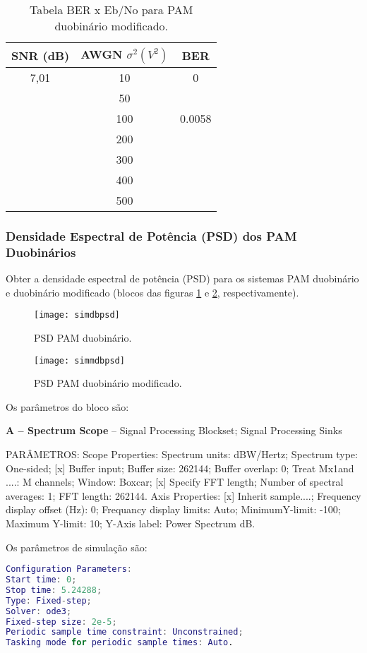 \begin{table}[H]
  \begin{center}
    \caption{Tabela BER x Eb/No para PAM duobinário modificado.}
    \begin{tabular}{|c|c|c|}
      \hline
      SNR (dB) & AWGN $\sigma^2 (V^2)$ & BER \\
      \hline
      7,01 & 10 & 0 \\
      \hline
      & 50 &  \\
      \hline
      & 100 & 0.0058 \\
      \hline
      & 200 & \\
      \hline
      & 300 & \\
      \hline
      & 400 & \\
      \hline 
      & 500 & \\
      \hline
    \end{tabular}
    \label{tab:simmdb}
  \end{center}
\end{table}

\subsubsection{Densidade Espectral de Potência (PSD) dos PAM Duobinários}

Obter a densidade espectral de potência (PSD) para os sistemas PAM duobinário e duobinário modificado (blocos das figuras \ref{fig:simdbpsd} e \ref{fig:simmdbpsd}, respectivamente).

\begin{figure}[H]
  \centering
  \caption{PSD PAM duobinário.}
  \texttt{[image: simdbpsd]}
  \label{fig:simdbpsd}
\end{figure}

\begin{figure}[H]
  \centering
  \caption{PSD PAM duobinário modificado.}
  \texttt{[image: simmdbpsd]}
  \label{fig:simmdbpsd}
\end{figure}

Os parâmetros do bloco são:

\textbf{A – Spectrum Scope} – Signal Processing Blockset; Signal Processing Sinks

PARÂMETROS: Scope Properties: Spectrum units: dBW/Hertz; Spectrum type: One-sided; [x] Buffer input; Buffer size: 262144; Buffer overlap: 0; Treat Mx1and ....: M channels; Window: Boxcar; [x] Specify FFT length; Number of spectral averages: 1; FFT length: 262144. Axis Properties: [x] Inherit sample....; Frequency display offset (Hz): 0; Frequancy display limits: Auto; MinimumY-limit: -100; Maximum Y-limit: 10; Y-Axis label: Power Spectrum dB.

Os parâmetros de simulação são:

\begin{lstlisting}[language=matlab]
Configuration Parameters: 
Start time: 0; 
Stop time: 5.24288; 
Type: Fixed-step;
Solver: ode3; 
Fixed-step size: 2e-5; 
Periodic sample time constraint: Unconstrained; 
Tasking mode for periodic sample times: Auto.
\end{lstlisting}